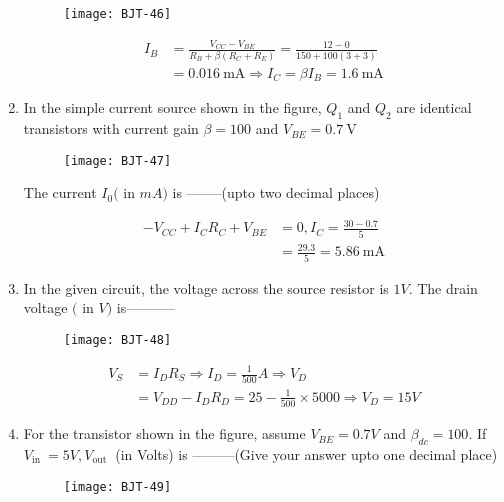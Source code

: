 \begin{enumerate}
\begin{figure}[H]
\centering
\texttt{[image: BJT-46]}
\end{figure}
\begin{answer}
\begin{align*}
I_{B}&=\frac{V_{C C}-V_{B E}}{R_{B}+\beta\left(R_{C}+R_{E}\right)}=\frac{12-0}{150+100(3+3)}\\&=0.016 \mathrm{~mA} \Rightarrow I_{C}=\beta I_{B}=1.6 \mathrm{~mA}
\end{align*}
\end{answer}
	\item In the simple current source shown in the figure, $Q_{1}$ and $Q_{2}$ are identical transistors with current gain $\beta=100$ and $V_{B E}=0.7 \mathrm{~V}$\\
	\begin{figure}[H]
		\centering
		\texttt{[image: BJT-47]}
	\end{figure}
	The current $I_{0}($ in $m A)$ is --------(upto two decimal places)
{	}
\begin{answer}
\begin{align*}
-V_{C C}+I_{C} R_{C}+V_{B E}&=0, I_{C}=\frac{30-0.7}{5}\\&=\frac{29.3}{5}=5.86 \mathrm{~mA}
\end{align*}
\end{answer}
	\item In the given circuit, the voltage across the source resistor is $1 V$. The drain voltage $($ in $V)$ is-----------
{	}
\begin{figure}[H]
\centering
\texttt{[image: BJT-48]}
\end{figure}
\begin{answer}
\begin{align*}
V_{S}&=I_{D} R_{S} \Rightarrow I_{D}=\frac{1}{500} A \Rightarrow V_{D}\\&=V_{D D}-I_{D} R_{D}=25-\frac{1}{500} \times 5000 \Rightarrow V_{D}=15 V
\end{align*}
\end{answer}
	\item For the transistor shown in the figure, assume $V_{B E}=0.7 V$ and $\beta_{d c}=100$. If $V_{\text {in }}=5 V, V_{\text {out }}$ (in Volts) is ---------(Give your answer upto one decimal place)
{	}
\begin{figure}[H]
\centering
\texttt{[image: BJT-49]}
\end{figure}
\begin{answer}

\end{answer}
\end{enumerate}

